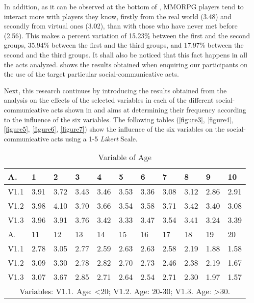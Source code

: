 \documentclass[english]{textolivre}
\begin{document}
In addition, as it can be observed at the bottom of , MMORPG players tend to interact more with players they know, firstly from the real world (3.48) and secondly from virtual ones (3.02), than with those who have never met before (2.56). This makes a percent variation of 15.23\% between the first and the second groups, 35.94\% between the first and the third groups, and 17.97\% between the second and the third groups. It shall also be noticed that this fact happens in all the acts analyzed.  shows the results obtained when enquiring our participants on the use of the target particular social-communicative acts. 

Next, this research continues by introducing the results obtained from the analysis on the effects of the selected variables in each of the different social-communicative acts shown in  and aims at determining their frequency according to the influence of the six variables. The following tables (\ref{figure3}, \ref{figure4}, \ref{figure5}, \ref{figure6}, \ref{figure7}) show the influence of the six variables on the social-communicative acts using a 1-5 \emph{Likert} Scale.

\begin{table}[htpb]
\caption{Variable of Age}
\label{figure2}
\centering
\begin{tabular}{lllllllllll}
\toprule
A. & 1 & 2 & 3 & 4 & 5 & 6 & 7 & 8 & 9 & 10
\\ 
\midrule
V1.1 & 3.91 & 3.72 & 3.43 & 3.46 & 3.53 & 3.36 & 3.08 & 3.12 & 2.86 & 2.91
\\
V1.2 & 3.98 & 4.10 & 3.70 & 3.66 & 3.54 & 3.58 & 3.71 & 3.42 & 3.40 & 3.08
\\
V1.3 & 3.96 & 3.91 & 3.76 & 3.42 & 3.33 & 3.47 & 3.54 & 3.41 & 3.24 & 3.39
\\
\midrule
A. & 11 & 12 & 13 & 14 & 15 & 16 & 17 & 18 & 19 & 20
\\
\midrule
V1.1 & 2.78 & 3.05 & 2.77 & 2.59 & 2.63 & 2.63 & 2.58 & 2.19 & 1.88 & 1.58
\\
V1.2 & 3.09 & 3.30 & 2.78 & 2.82 & 2.70 & 2.73 & 2.46 & 2.38 & 2.19 & 1.67
\\
V1.3 & 3.07 & 3.67 & 2.85 & 2.71 & 2.64 & 2.54 & 2.71 & 2.30 & 1.97 & 1.57
\\ 
\midrule
\multicolumn{11}{c}{Variables: V1.1. Age: <20; V1.2. Age: 20-30; V1.3. Age: >30.}
\\
\bottomrule
\end{tabular}
\end{table}
\end{document}
